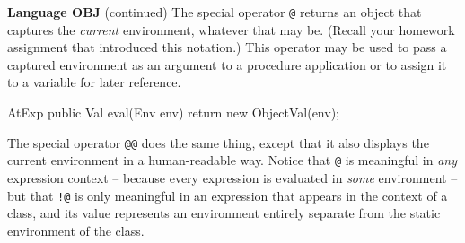 \begin{minipage}[t]{\sw}
\slidenumber
\LARGE
{\bf Language OBJ} (continued)\exx
The special operator \verb'@'
returns an object
that captures the {\em current} environment,
whatever that may be.
(Recall your homework assignment that introduced this notation.)
This operator may be used
to pass a captured environment as an argument
to a procedure application or
to assign it to a variable for later reference.
\begin{qv}
AtExp
    public Val eval(Env env) {
        return new ObjectVal(env);
    }

\end{qv}
The special operator \verb'@@' does the same thing,
except that it also displays the current environment
in a human-readable way.\exx
Notice that \verb'@' is meaningful in {\em any} expression context --
because every expression is evaluated in {\em some} environment --
but that \verb'!@' is only meaningful
in an expression that appears in the context of a class,
and its value represents an environment entirely separate
from the static environment of the class.
\end{minipage}
